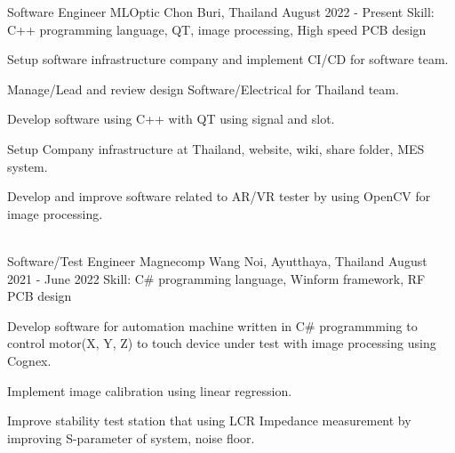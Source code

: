 
\begin{cventries}

  \cventry
    {Software Engineer} %
    {MLOptic} %
    {Chon Buri, Thailand} %
    {August 2022 - Present} %
    {Skill: C++ programming language, QT, image processing, High speed PCB design} %
    {
      \begin{cvitems} %
      \item {Setup software infrastructure company and implement CI/CD for software team.}
      \item {Manage/Lead and review design Software/Electrical for Thailand team.}
      \item {Develop software using C++ with QT using signal and slot.}
      \item {Setup Company infrastructure at Thailand, website, wiki, share folder, MES system.}
      \item {Develop and improve software related to AR/VR tester by using OpenCV for image processing.}
      \end{cvitems}
    }
\\
  \cventry
    {Software/Test Engineer} %
    {Magnecomp} %
    {Wang Noi, Ayutthaya, Thailand} %
    {August 2021 - June 2022} %
    {Skill: C\# programming language, Winform framework, RF PCB design} %
    {
      \begin{cvitems} %
      \item {Develop software for automation machine written in C\# programmming
        to control motor(X, Y, Z) to touch device under test with image processing using Cognex.}
      \item {Implement image calibration using linear regression.}
      \item {Improve stability test station that using LCR Impedance measurement
        by improving S-parameter of system, noise floor.}

\end{cvitems}}
\end{cventries}
